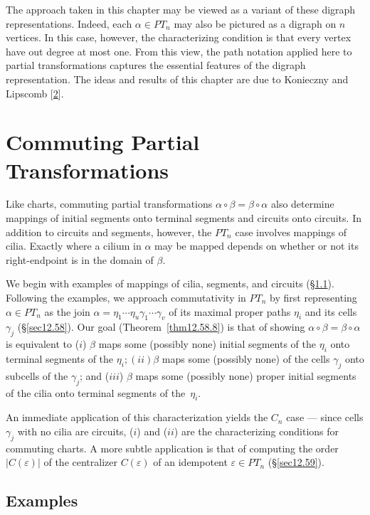 \documentclass{surv-l}
\numberwithin{equation}{section}
\numberwithin{table}{section}
\numberwithin{figure}{section}
\theoremstyle{definition}
\begin{document}
The approach taken in this chapter may be viewed as a variant of
these digraph representations. Indeed, each $\alpha\in PT_{n}$ may
also be pictured as a digraph on $n$ vertices. In this case,
however, the characterizing condition is that every vertex have
out degree at most one. From this view, the path notation applied
here to partial transformations captures the essential features of
the digraph representation. The ideas and results of this chapter
are due to Konieczny and Lipscomb
[\hyperlink{bib37a}{2}].

\chapter{Commuting Partial Transformations}\label{chap12}

Like charts, commuting partial transformations $\alpha
\circ\beta=\beta \circ\alpha$ also determine mappings of initial
segments onto terminal segments and circuits onto circuits. In
addition to circuits and segments, however, the $PT_{n}$ case
involves mappings of cilia. Exactly where a cilium in $\alpha$ may
be mapped depends on whether or not its right-endpoint is in the
domain of $\beta$.

We begin with examples of mappings of cilia, segments, and
circuits (\S\ref{sec12.57}). Following the examples, we approach
commutativity in $PT_{n}$ by first representing $\alpha\in PT_{n}$
as the join
$\alpha=\eta_{1}\cdots\eta_{u}\gamma_{1}\cdots\gamma_{v}$ of its
maximal proper paths $\eta_{i}$ and its cells $\gamma_{j}$
(\S\ref{sec12.58}). Our goal (Theorem~\ref{thm12.58.8}) is that of
showing $\alpha \circ\beta=\beta \circ\alpha$ is equivalent to
($i$) $\beta$ maps some (possibly none) initial segments of the
$\eta_{i}$ onto terminal segments of the $\eta_{i}; (ii)\beta$
maps some (possibly none) of the cells $\gamma_{j}$ onto subcells
of the $\gamma_{j}$; and ($iii$) $\beta$ maps some (possibly none)
proper initial segments of the cilia onto terminal segments of
the~$\eta_{i}$.

An immediate application of this characterization yields the
$C_{n}$ case --- since cells $\gamma_{j}$ with no cilia are
circuits, ($i$) and ($ii$) are the characterizing conditions for
commuting charts. A more subtle application is that of computing
the order $|C(\varepsilon)|$ of the centralizer $C(\varepsilon)$
of an idempotent $\varepsilon\in PT_{n}$ (\S\ref{sec12.59}).

\setcounter{section}{56}
\section{Examples}\label{sec12.57}
\end{document}
